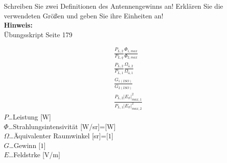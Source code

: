 \begin{question}[section=10,name={Antennengewinn 1},difficulty=,quantity=2,type=thr,tags={}]
	Schreiben Sie zwei Definitionen des Antennengewinns an! Erklären Sie
	die verwendeten Größen und geben Sie ihre Einheiten an! 
	\\ \textbf{Hinweis:}\\
	Übungsskript Seite 179
\end{question}
\begin{solution}
	\begin{align}
	&\frac{P_{L,2}}{P_{L,q}} \frac{\Phi_{1,max}}{\Phi_{2,max}}\\
	&\frac{P_{L,2}}{P_{L,1}} \frac{\Omega_{ä,2}}{\Omega_{ä,1}}\\
	&\frac{G_{1(ISO)}}{G_{2(ISO)}}\\
	&\frac{P_{L,2} |E_\vartheta|^2_{max,1}}{P_{L,1} |E_\vartheta|^2_{max,2}}
\end{align}
	$P$\dots Leistung [W]\\
	$\Phi$\dots Strahlungsintensivität [W/sr]=[W]\\
	$\Omega$\dots Äquivalenter Raumwinkel [sr]=[$1$]\\
	$G$\dots Gewinn [$1$]\\
	$E$\dots Feldstrke [V/m]
\end{solution}